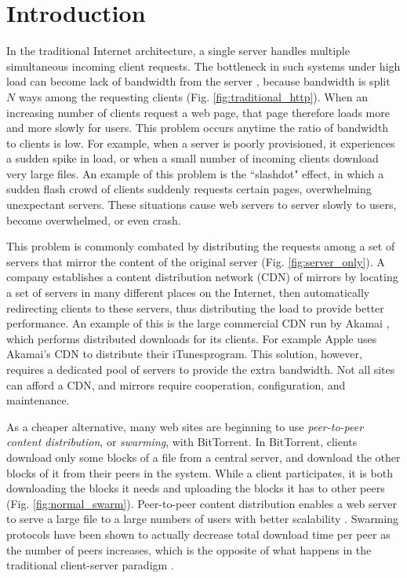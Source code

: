 \section {Introduction}

In the traditional Internet architecture, a single server handles multiple simultaneous incoming client requests.  
The bottleneck in such systems under high load can become lack of bandwidth from the server \cite{coopnet}, because bandwidth is split $N$ 
ways among the requesting clients (Fig. \ref{fig:traditional_http}).  When an increasing number of clients request a web page, that page 
therefore loads more and more slowly for users.  This problem occurs anytime the ratio of bandwidth to clients is low.  For example, when a server 
is poorly provisioned, it experiences a sudden spike in load, or when a small number of incoming clients download very large files.  An example of this problem 
is the ``slashdot" effect, in which a sudden flash crowd of clients suddenly requests certain pages, overwhelming unexpectant servers.  
These situations cause web servers to server slowly to users, become overwhelmed, or even crash.

This problem is commonly combated by distributing the requests among a set of servers that mirror the content of the original server (Fig. \ref{fig:server_only}).  
A company establishes a content distribution network (CDN) of mirrors by locating a set of servers in many different places on the Internet, then automatically redirecting clients to these servers, thus 
distributing the load to provide better performance.  An example of this is the large commercial CDN run by Akamai \cite{akamai}, which performs distributed
downloads for its clients.  For example Apple uses Akamai's CDN to distribute their iTunes\texttrademark  program.  This solution,  however, requires a dedicated pool of 
servers to provide the extra bandwidth.  Not all sites can afford a CDN, and  mirrors require cooperation, configuration, and maintenance.

As a cheaper alternative, many web sites are beginning to use \emph{peer-to-peer content distribution}, or \emph{swarming}, with BitTorrent.  In BitTorrent, clients 
download only some blocks of a file from a central server, and download the other blocks of it from their peers in the system.  While a client participates, it is both downloading 
the  blocks it needs and uploading the blocks it has to other peers (Fig. \ref{fig:normal_swarm}).  Peer-to-peer content distribution enables a 
web server to serve a large file to a large numbers of users with better scalability \cite{zappala}. Swarming protocols have been shown to actually decrease total download 
time per peer as the number of peers increases, which is the opposite of what happens in the traditional client-server paradigm \cite{slurpie}. 

